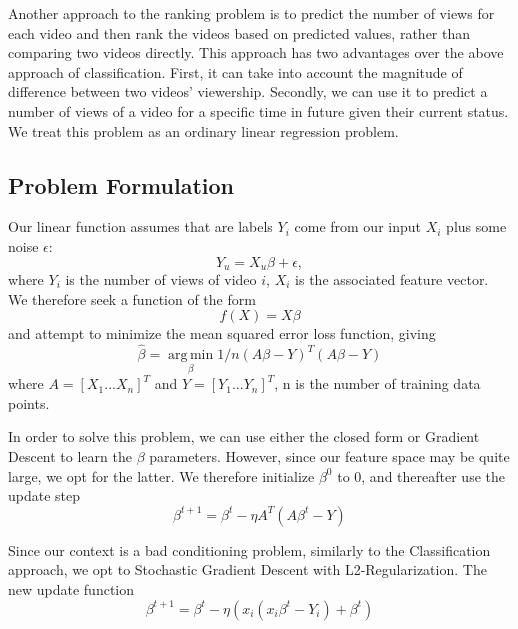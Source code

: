 Another approach to the ranking problem is to predict the number of views for each video and then rank the videos based on predicted values, rather than comparing two videos directly. This approach has two advantages over the above approach of classification. First, it can take into account the magnitude of difference between two videos' viewership. Secondly, we can use it to predict a number of views of a video for a specific time in future given their current status. We treat this problem as an ordinary linear regression problem. 

\subsection{Problem Formulation}
Our linear function assumes that are labels $Y_i$ come from our input $X_i$ plus some noise $\epsilon$:
\begin{equation}
Y_u = X_u \beta + \epsilon,
\end{equation}
where $Y_i$ is the number of views of video $i$, $X_i$ is the associated feature vector. We therefore seek a function of the form
\begin{equation}
f(X) = X \beta
\end{equation}
and attempt to minimize the mean squared error loss function, giving
\begin{equation}
	\hat{\beta} = \operatorname*{arg\,min}_{\textbf{$\beta$}} 1/n (A \beta - Y)^T(A \beta - Y)
\end{equation}
where $A = [X_1 ... X_n]^T$ and $Y = [Y_1 ... Y_n]^T$, n is the number of training data points.


In order to solve this problem, we can use either the closed form or Gradient Descent to learn the $\beta$ parameters.  However, since our feature space may be quite large, we opt for the latter.  We therefore initialize $\beta^0$ to 0, and thereafter use the update step
\begin{equation}
\beta^{t+1} = \beta^t - \eta A^T (A \beta^t - Y)
\end{equation}
 
Since our context is a bad conditioning problem, similarly to the Classification approach, we opt to Stochastic Gradient Descent with L2-Regularization. The new update function
	\begin{equation}
		\beta^{t+1} = \beta^t - \eta (x_i (x_i\beta^t - Y_i) + \beta^t)
	\end{equation}

